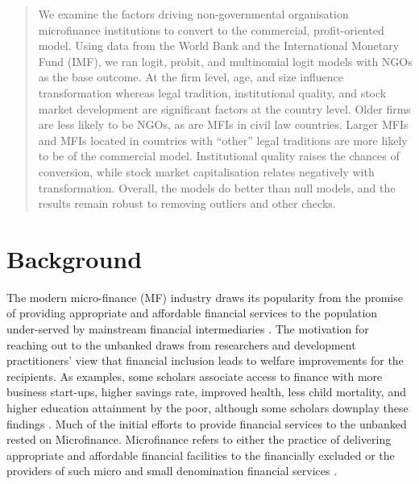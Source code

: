 \documentclass[a4paper,nobind]{templates/ociamthesis}
\begin{document}
\begin{quote}
We examine the factors driving non-governmental organisation microfinance institutions to convert to the commercial, profit-oriented model. Using data from the World Bank and the International Monetary Fund (IMF), we ran logit, probit, and multinomial logit models with NGOs as the base outcome. At the firm level, age, and size influence transformation whereas legal tradition, institutional quality, and stock market development are significant factors at the country level. Older firms are less likely to be NGOs, as are MFIs in civil law countries. Larger MFIs and MFIs located in countries with ``other'' legal traditions are more likely to be of the commercial model. Institutional quality raises the chances of conversion, while stock market capitalisation relates negatively with transformation. Overall, the models do better than null models, and the results remain robust to removing outliers and other checks.
\end{quote}

\hypertarget{background}{%
\chapter{\texorpdfstring{\textbf{Background}}{Background}}\label{background}}

The modern micro-finance (MF) industry draws its popularity from the promise of providing appropriate and affordable financial services to the population under-served by mainstream financial intermediaries \autocite{morduch1999microfinance,morduch2000microfinance}. The motivation for reaching out to the unbanked draws from researchers and development practitioners' view that financial inclusion leads to welfare improvements for the recipients. As examples, some scholars associate access to finance with more business start-ups, higher savings rate, improved health, less child mortality, and higher education attainment by the poor, although some scholars downplay these findings \autocite{klapper2015role,o2017systematic,shahriar2017lender}. Much of the initial efforts to provide financial services to the unbanked rested on Microfinance. Microfinance refers to either the practice of delivering appropriate and affordable financial facilities to the financially excluded or the providers of such micro and small denomination financial services \autocite{ledgerwood2006transforming}.
\end{document}
